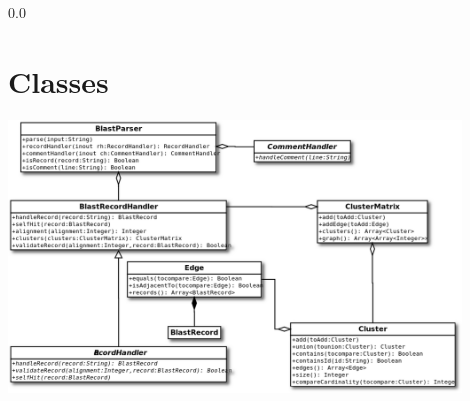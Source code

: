 \documentclass[11pt,notitlepage]{article}
\begin{document}
  {\setlength{\baselineskip}%
           {0.0\baselineskip}
  \section*{\hfill Classes}
  \hrulefill \par}

  \includegraphics[width=120mm]{api/images/blast_clusters1_Class1.png}  

  
  
  
  
  
  
  
  
\end{document}
